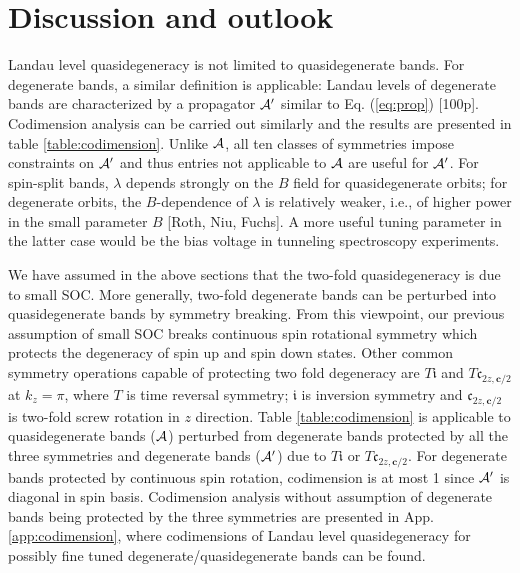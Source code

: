 \documentclass[aps, prb, showpacs, twocolumn, notitlepage, superscriptaddress]{revtex4-1}
\begin{document}
\section{Discussion and outlook}

Landau level quasidegeneracy is not limited to quasidegenerate bands. For degenerate bands, a similar definition is applicable: 
 Landau levels of degenerate bands are characterized by a propagator ${\cal A}'$ similar to Eq. (\ref{eq:prop}) [100p]. Codimension analysis can be carried out similarly and the results are presented in table \ref{table:codimension}. Unlike ${\cal A}$, all ten classes of symmetries impose constraints on ${\cal A}'$ and thus entries not applicable to ${\cal A}$ are useful for ${\cal A}'$. For spin-split bands, $\lambda$ depends strongly on the $B$ field for quasidegenerate orbits; for degenerate orbits, the $B$-dependence of $\lambda$ is relatively weaker, i.e., of higher power in the small parameter $B$ [Roth, Niu, Fuchs]. A more useful tuning parameter in the latter case would be the bias voltage in tunneling spectroscopy experiments. 

We have assumed in the above sections that the two-fold quasidegeneracy is due to small SOC. More generally, two-fold degenerate bands can be perturbed into quasidegenerate bands by symmetry breaking. From this viewpoint, our previous assumption of small SOC breaks continuous spin rotational symmetry which protects the degeneracy of spin up and spin down states. Other common symmetry operations capable of protecting two fold degeneracy are $T\mathfrak{i}$ and $T\mathfrak{c}_{2z,\boldsymbol{c}/2}$ at $k_z=\pi$, where $T$ is time reversal symmetry; $\mathfrak{i}$ is inversion symmetry and $\mathfrak{c}_{2z,\boldsymbol{c}/2}$ is two-fold screw rotation in $z$ direction. Table \ref{table:codimension} is applicable to quasidegenerate bands (${\cal A}$) perturbed from degenerate bands protected by all the three symmetries and degenerate bands (${\cal A}'$) due to $T\mathfrak{i}$ or $T\mathfrak{c}_{2z,\boldsymbol{c}/2}$. For degenerate bands protected by continuous spin rotation, codimension is at most 1 since ${\cal A}'$ is diagonal in spin basis. Codimension analysis without assumption of degenerate bands being protected by the three symmetries are presented in App. \ref{app:codimension}, where codimensions of Landau level quasidegeneracy for possibly fine tuned degenerate/quasidegenerate bands can be found.
\end{document}
